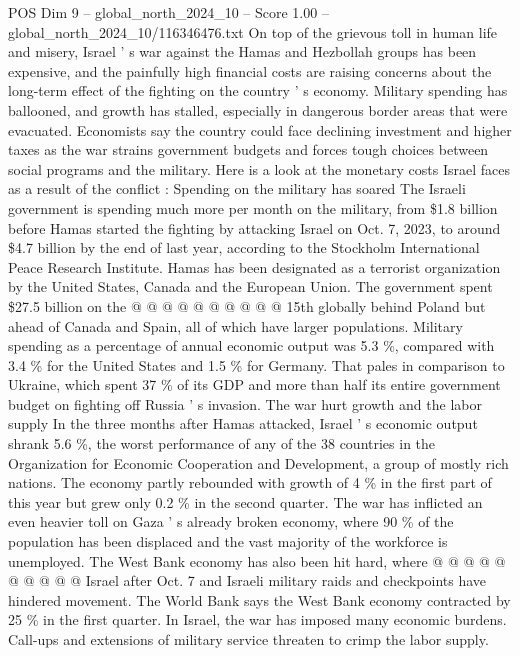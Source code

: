 \begin{textsample}{POS Dim 9 – global\_north\_2024\_10 – Score 1.00 – global\_north\_2024\_10/116346476.txt}  \label{ex:f9_pos_400}
On top of the grievous toll in human life and misery, Israel ' s war against the Hamas and Hezbollah groups has been expensive, and the painfully high financial costs are raising concerns about the long-term effect of the fighting on the country ' s economy.
Military spending has ballooned, and growth has stalled, especially in dangerous border areas that were evacuated.
Economists say the country could face declining investment and higher taxes as the war strains government budgets and forces tough choices between social programs and the military.
Here is a look at the monetary costs Israel faces as a result of the conflict : Spending on the military has soared The Israeli government is spending much more per month on the military, from \$1.8 billion before Hamas started the fighting by attacking Israel on Oct. 7, 2023, to around \$4.7 billion by the end of last year, according to the Stockholm International Peace Research Institute.
Hamas has been designated as a terrorist organization by the United States, Canada and the European Union.
The government spent \$27.5 billion on the @ @ @ @ @ @ @ @ @ @ 15th globally behind Poland but ahead of Canada and Spain, all of which have larger populations.
Military spending as a percentage of annual economic output was 5.3 \%, compared with 3.4 \% for the United States and 1.5 \% for Germany.
That pales in comparison to Ukraine, which spent 37 \% of its GDP and more than half its entire government budget on fighting off Russia ' s invasion.
The war hurt growth and the labor supply In the three months after Hamas attacked, Israel ' s economic output shrank 5.6 \%, the worst performance of any of the 38 countries in the Organization for Economic Cooperation and Development, a group of mostly rich nations.
The economy partly rebounded with growth of 4 \% in the first part of this year but grew only 0.2 \% in the second quarter.
The war has inflicted an even heavier toll on Gaza ' s already broken economy, where 90 \% of the population has been displaced and the vast majority of the workforce is unemployed.
The West Bank economy has also been hit hard, where @ @ @ @ @ @ @ @ @ @ Israel after Oct. 7 and Israeli military raids and checkpoints have hindered movement.
The World Bank says the West Bank economy contracted by 25 \% in the first quarter.
In Israel, the war has imposed many economic burdens.
Call-ups and extensions of military service threaten to crimp the labor supply.

\end{textsample}
